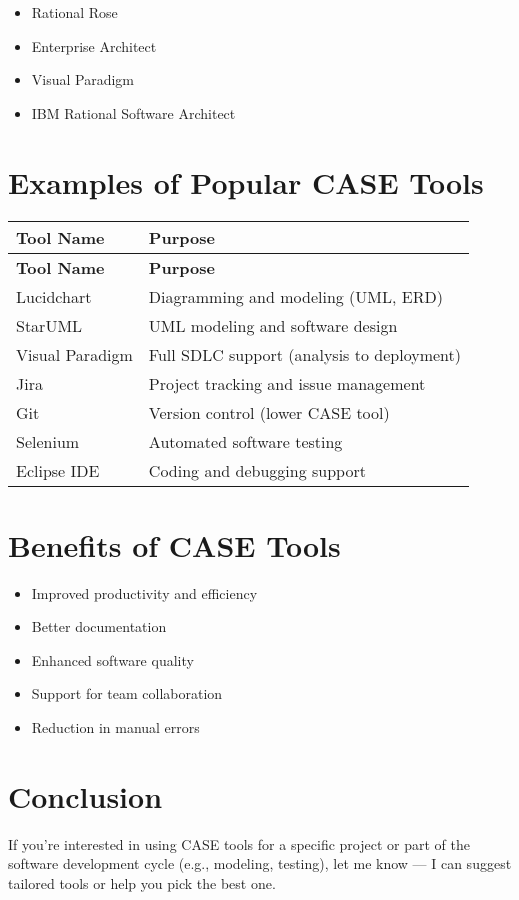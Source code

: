 \documentclass[aspectratio=1810]{beamer}
\begin{document}
\begin{itemize}
    \item Rational Rose
    \item Enterprise Architect
    \item Visual Paradigm
    \item IBM Rational Software Architect
\end{itemize}

\section*{Examples of Popular CASE Tools}

\begin{longtable}{|l|l|}
\hline
\textbf{Tool Name} & \textbf{Purpose} \\
\hline
\endfirsthead
\hline
\textbf{Tool Name} & \textbf{Purpose} \\
\hline
\endhead
Lucidchart & Diagramming and modeling (UML, ERD) \\
StarUML & UML modeling and software design \\
Visual Paradigm & Full SDLC support (analysis to deployment) \\
Jira & Project tracking and issue management \\
Git & Version control (lower CASE tool) \\
Selenium & Automated software testing \\
Eclipse IDE & Coding and debugging support \\
\hline
\end{longtable}

\section*{Benefits of CASE Tools}

\begin{itemize}
    \item Improved productivity and efficiency
    \item Better documentation
    \item Enhanced software quality
    \item Support for team collaboration
    \item Reduction in manual errors
\end{itemize}

\section*{Conclusion}
If you're interested in using CASE tools for a specific project or part of the software development cycle (e.g., modeling, testing), let me know — I can suggest tailored tools or help you pick the best one.
\end{document}
